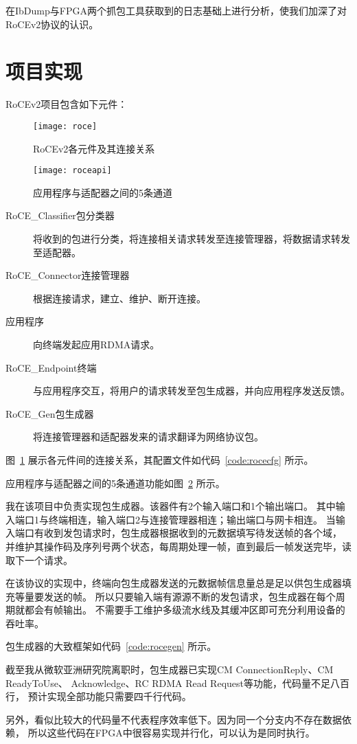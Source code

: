 在IbDump与FPGA两个抓包工具获取到的日志基础上进行分析，使我们加深了对RoCEv2协议的认识。

\section{项目实现}
RoCEv2项目包含如下元件：
\begin{figure}[htbp]
\centering
\texttt{[image: roce]}
\caption{RoCEv2各元件及其连接关系} \label{fig:roce}
\end{figure}

\begin{figure}[htbp]
\centering

\end{figure}

\begin{figure}[htbp]
\centering
\texttt{[image: roceapi]}
\caption{应用程序与适配器之间的5条通道} \label{fig:roceapi}
\end{figure}

\begin{description}
\item[RoCE\_Classifier包分类器]将收到的包进行分类，将连接相关请求转发至连接管理器，将数据请求转发至适配器。
\item[RoCE\_Connector连接管理器]根据连接请求，建立、维护、断开连接。
\item[应用程序]向终端发起应用RDMA请求。
\item[RoCE\_Endpoint终端]与应用程序交互，将用户的请求转发至包生成器，并向应用程序发送反馈。
\item[RoCE\_Gen包生成器]将连接管理器和适配器发来的请求翻译为网络协议包。
\end{description}

图~\ref{fig:roce} 展示各元件间的连接关系，其配置文件如代码~\ref{code:rocecfg} 所示。

应用程序与适配器之间的5条通道功能如图~\ref{fig:roceapi} 所示。

我在该项目中负责实现包生成器。该器件有2个输入端口和1个输出端口。
其中输入端口1与终端相连，输入端口2与连接管理器相连；输出端口与网卡相连。
当输入端口有收到发包请求时，包生成器根据收到的元数据填写待发送帧的各个域，
并维护其操作码及序列号两个状态，每周期处理一帧，直到最后一帧发送完毕，读取下一个请求。

在该协议的实现中，终端向包生成器发送的元数据帧信息量总是足以供包生成器填充等量要发送的帧。
所以只要输入端有源源不断的发包请求，包生成器在每个周期就都会有帧输出。
不需要手工维护多级流水线及其缓冲区即可充分利用设备的吞吐率。

包生成器的大致框架如代码~\ref{code:rocegen} 所示。


截至我从微软亚洲研究院离职时，包生成器已实现CM ConnectionReply、CM ReadyToUse、
Acknowledge、RC RDMA Read Request等功能，代码量不足八百行，
预计实现全部功能只需要四千行代码。

另外，看似比较大的代码量不代表程序效率低下。因为同一个分支内不存在数据依赖，
所以这些代码在FPGA中很容易实现并行化，可以认为是同时执行。
